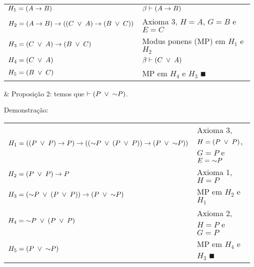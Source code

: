 \begin{tabular}{p{}p{}}
  \hline
    $H_1 = (A \rightarrow B)$                                         & $ \beta \vdash (A \rightarrow B)$ \\
    $H_2 = (A \rightarrow B) \rightarrow ( (C \;\lor\; A) \rightarrow (B \;\lor\; C) )$       & Axioma 3, $H = A$, $G = B$ e $E = C$ \\
    $H_3 = (C \;\lor\; A) \rightarrow (B \;\lor\; C)$                           & Modus ponens (MP) em $H_1$ e $H_2$ \\
    $H_4 = (C \;\lor\; A)$                                          & $ \beta \vdash (C \;\lor\; A)$ \\
    $H_5 = (B \;\lor\; C)$                                          & MP em $H_4$ e $H_3$ $\QED$ \\
  \hline
\end{tabular}

\SKIP

\begin{easylist}

  & Proposição 2: temos que $\vdash (P \;\lor\; \mathord{\sim} P)$.

\end{easylist}

\SKIP

Demonstração:

\begin{tabular}{p{}p{}}
  \hline
    $H_1 = ( (P \;\lor\; P) \rightarrow P) \rightarrow ( (\mathord{\sim} P \;\lor\; (P \;\lor\; P) ) \rightarrow (P \;\lor\; \mathord{\sim} P) )$       & Axioma 3, $H = (P \;\lor\; P)$, $G = P$ e $E = \mathord{\sim} P$ \\
    $H_2 = (P \;\lor\; P) \rightarrow P$                                   & Axioma 1, $H = P$ \\
    $H_3 = (\mathord{\sim} P \;\lor\; (P \;\lor\; P) ) \rightarrow (P \;\lor\; \mathord{\sim} P)$        & MP em $H_2$ e $H_1$ \\
    $H_4 = \mathord{\sim} P \;\lor\; (P \;\lor\; P)$                            & Axioma 2, $H = P$ e $G = P$ \\
    $H_5 = (P \;\lor\; \mathord{\sim} P)$                                     & MP em $H_4$ e $H_3$ $\QED$ \\
  \hline
\end{tabular}

\SKIP

